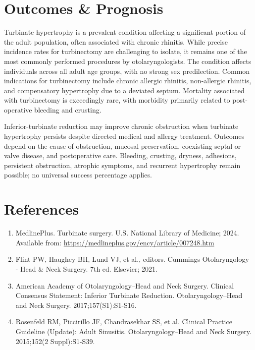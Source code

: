 \section*{Outcomes \& Prognosis}
Turbinate hypertrophy is a prevalent condition affecting a significant portion of the adult population, often associated with chronic rhinitis. While precise incidence rates for turbinectomy are challenging to isolate, it remains one of the most commonly performed procedures by otolaryngologists. The condition affects individuals across all adult age groups, with no strong sex predilection. Common indications for turbinectomy include chronic allergic rhinitis, non-allergic rhinitis, and compensatory hypertrophy due to a deviated septum. Mortality associated with turbinectomy is exceedingly rare, with morbidity primarily related to post-operative bleeding and crusting.

Inferior-turbinate reduction may improve chronic obstruction when turbinate hypertrophy persists despite directed medical and allergy treatment. Outcomes depend on the cause of obstruction, mucosal preservation, coexisting septal or valve disease, and postoperative care. Bleeding, crusting, dryness, adhesions, persistent obstruction, atrophic symptoms, and recurrent hypertrophy remain possible; no universal success percentage applies.

\section*{References}
\begin{enumerate}
  \item MedlinePlus. Turbinate surgery. U.S. National Library of Medicine; 2024. Available from: \url{https://medlineplus.gov/ency/article/007248.htm}
  
  \item Flint PW, Haughey BH, Lund VJ, et al., editors. Cummings Otolaryngology - Head \& Neck Surgery. 7th ed. Elsevier; 2021.
  
  \item American Academy of Otolaryngology--Head and Neck Surgery. Clinical Consensus Statement: Inferior Turbinate Reduction. Otolaryngology--Head and Neck Surgery. 2017;157(S1):S1-S16.
  
  \item Rosenfeld RM, Piccirillo JF, Chandrasekhar SS, et al. Clinical Practice Guideline (Update): Adult Sinusitis. Otolaryngology--Head and Neck Surgery. 2015;152(2 Suppl):S1-S39.
\end{enumerate}

\clearpage
